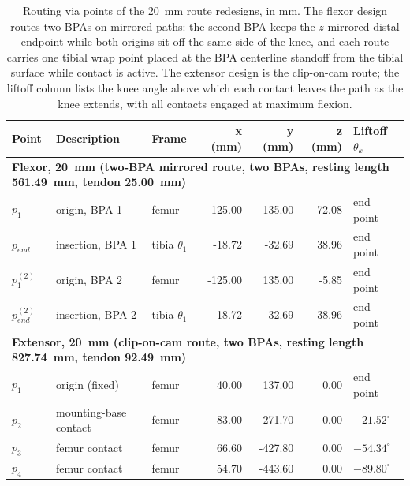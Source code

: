 \documentclass[utf8]{frontiers_suppmat} %
\begin{document}
\begin{table}[htbp]
\caption{Routing via points of the \qty{20}{\milli\metre} route redesigns, in mm. The flexor design routes two BPAs on mirrored paths: the second BPA keeps the $z$-mirrored distal endpoint while both origins sit off the same side of the knee, and each route carries one tibial wrap point placed at the BPA centerline standoff from the tibial surface while contact is active. The extensor design is the clip-on-cam route; the liftoff column lists the knee angle above which each contact leaves the path as the knee extends, with all contacts engaged at maximum flexion.}
\label{tab:RouteRedesign20}
\centering
\small
\begin{tabular}{lllrrrl}
\hline
\textbf{Point} & \textbf{Description} & \textbf{Frame} & \textbf{x (mm)} & \textbf{y (mm)} & \textbf{z (mm)} & \textbf{Liftoff $\theta_{k}$} \\
\hline
\multicolumn{7}{l}{\textbf{Flexor, \qty{20}{\milli\metre} (two-BPA mirrored route, two BPAs, resting length \qty{561.49}{\milli\metre}, tendon \qty{25.00}{\milli\metre})}} \\
\hspace{3mm} $p_{1}$ & origin, BPA 1 & femur & -125.00 & 135.00 & 72.08 & end point \\
\hspace{3mm} $p_{end}$ & insertion, BPA 1 & tibia $\theta_{1}$ & -18.72 & -32.69 & 38.96 & end point \\
\hspace{3mm} $p_{1}^{(2)}$ & origin, BPA 2 & femur & -125.00 & 135.00 & -5.85 & end point \\
\hspace{3mm} $p_{end}^{(2)}$ & insertion, BPA 2 & tibia $\theta_{1}$ & -18.72 & -32.69 & -38.96 & end point \\
\multicolumn{7}{l}{\textbf{Extensor, \qty{20}{\milli\metre} (clip-on-cam route, two BPAs, resting length \qty{827.74}{\milli\metre}, tendon \qty{92.49}{\milli\metre})}} \\
\hspace{3mm} $p_{1}$ & origin (fixed) & femur & 40.00 & 137.00 & 0.00 & end point \\
\hspace{3mm} $p_{2}$ & mounting-base contact & femur & 83.00 & -271.70 & 0.00 & $-21.52^{\circ}$ \\
\hspace{3mm} $p_{3}$ & femur contact & femur & 66.60 & -427.80 & 0.00 & $-54.34^{\circ}$ \\
\hspace{3mm} $p_{4}$ & femur contact & femur & 54.70 & -443.60 & 0.00 & $-89.80^{\circ}$ \\

\end{tabular}
\end{table}
\end{document}
